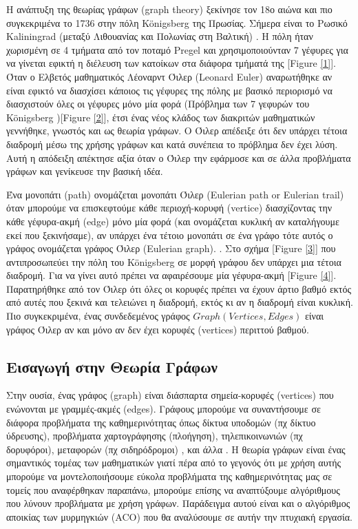 Η ανάπτυξη της θεωρίας γράφων (graph theory) ξεκίνησε τον 18ο αιώνα και πιο συγκεκριμένα το 1736 στην πόλη Königsberg της Πρωσίας. Σήμερα είναι το Ρωσικό Kaliningrad (μεταξύ Λιθουανίας και Πολωνίας στη Βαλτική) \cite{manwlopoulos2014thewria}. Η πόλη ήταν χωρισμένη σε 4 τμήματα από τον ποταμό Pregel και χρησιμοποιούνταν 7 γέφυρες για να γίνεται εφικτή η διέλευση των κατοίκων στα διάφορα τμήματά της [Figure \ref{1}]. Όταν ο Ελβετός μαθηματικός Λέοναρντ Όιλερ (Leonard Euler) αναρωτήθηκε αν είναι εφικτό να διασχίσει κάποιος τις γέφυρες της πόλης με βασικό περιορισμό να διασχιστούν όλες οι γέφυρες μόνο μία φορά (Πρόβλημα των 7 γεφυρών του Königsberg )[Figure \ref{2}], έτσι ένας νέος κλάδος των διακριτών μαθηματικών γεννήθηκε, γνωστός και ως θεωρία γράφων. Ο Όιλερ απέδειξε ότι δεν υπάρχει τέτοια διαδρομή μέσω της χρήσης γράφων και κατά συνέπεια το πρόβλημα δεν έχει λύση. Αυτή η απόδειξη απέκτησε αξία όταν ο Όιλερ την εφάρμοσε και σε άλλα προβλήματα γράφων και γενίκευσε την βασική ιδέα. 

Ένα μονοπάτι (path) ονομάζεται μονοπάτι Όιλερ (Eulerian path or Eulerian trail) όταν μπορούμε να επισκεφτούμε κάθε περιοχή-κορυφή (vertice) διασχίζοντας την κάθε γέφυρα-ακμή (edge) μόνο μία φορά (και ονομάζεται κυκλική αν καταλήγουμε εκεί που ξεκινήσαμε), αν υπάρχει ένα τέτοιο μονοπάτι σε ένα γράφο τότε αυτός ο γράφος ονομάζεται γράφος Όιλερ (Eulerian graph). \cite{ntenisiwtis2023thewria}. Στο σχήμα [Figure \ref{3}] που αντιπροσωπεύει την πόλη του Königsberg σε μορφή γράφου δεν υπάρχει μια τέτοια διαδρομή. Για να γίνει αυτό πρέπει να αφαιρέσουμε μία γέφυρα-ακμή [Figure \ref{4}]. Παρατηρήθηκε από τον Όιλερ ότι όλες οι κορυφές πρέπει να έχουν άρτιο βαθμό εκτός από αυτές που ξεκινά και τελειώνει η διαδρομή, εκτός κι αν η διαδρομή είναι κυκλική. Πιο συγκεκριμένα, ένας συνδεδεμένος γράφος $Graph(Vertices,Edges)$ είναι γράφος Όιλερ αν και μόνο αν δεν έχει κορυφές (vertices) περιττού βαθμού. \cite{bondy1976usr}


\subsection{Εισαγωγή στην Θεωρία Γράφων}

Στην ουσία, ένας γράφος (graph) είναι διάσπαρτα σημεία-κορυφές (vertices) που ενώνονται με γραμμές-ακμές (edges). Γράφους μπορούμε να συναντήσουμε σε διάφορα προβλήματα της καθημερινότητας όπως δίκτυα υποδομών (πχ δίκτυο ύδρευσης), προβλήματα χαρτογράφησης (πλοήγηση), τηλεπικοινωνιών (πχ δορυφόροι), μεταφορών (πχ σιδηρόδρομοι) , και άλλα \cite{manwlopoulos2014thewria}. Η θεωρία γράφων είναι ένας σημαντικός τομέας των μαθηματικών γιατί πέρα από το γεγονός ότι με χρήση αυτής μπορούμε να μοντελοποιήσουμε εύκολα προβλήματα της καθημερινότητας μας σε τομείς που αναφέρθηκαν παραπάνω, μπορούμε επίσης να αναπτύξουμε αλγόριθμους που λύνουν προβλήματα με χρήση γράφων. Παράδειγμα αυτού είναι και ο αλγόριθμος αποικίας των μυρμηγκιών (ACO) που θα αναλύσουμε σε αυτήν την πτυχιακή εργασία.

